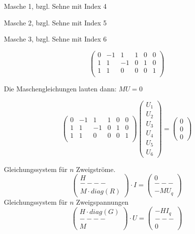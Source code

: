 \documentclass[german]{article}
\begin{document}
	Masche 1, bzgl. Sehne mit Index 4


	Masche 2, bzgl. Sehne mit Index 5


	Masche 3, bzgl. Sehne mit Index 6

	\[
		\begin{pmatrix}
			0 & -1 & 1 & 1 & 0 & 0 \\
			1 & 1 & -1 & 0 & 1 & 0 \\
			1 & 1 & 0 & 0 & 0 & 1 \\
		\end{pmatrix}
	\]

	Die Maschengleichungen lauten dann: $MU = 0$

	\[
		\begin{pmatrix}
			0 & -1 & 1 & 1 & 0 & 0 \\
			1 & 1 & -1 & 0 & 1 & 0 \\
			1 & 1 & 0 & 0 & 0 & 1 \\
		\end{pmatrix}
		\begin{pmatrix}
			U_1 \\
			U_2 \\
			U_3 \\
			U_4 \\
			U_5 \\
			U_6
		\end{pmatrix}
		=
		\begin{pmatrix}
			0 \\
			0 \\
			0
		\end{pmatrix}
	\]



	Gleichungssystem für $n$ Zweigströme.
	\[
		\begin{pmatrix}
			H \\
			---- \\
			M \cdot diag(R)
		\end{pmatrix}
		\cdot I =
		\begin{pmatrix}
			0 \\
			--- \\
			-M U_q
		\end{pmatrix}
	\]
	Gleichungssystem für $n$ Zweigspannungen
	\[
		\begin{pmatrix}
			H \cdot diag(G) \\
			---- \\
			M
		\end{pmatrix}
		\cdot U =
		\begin{pmatrix}
			-H I_q \\
			--- \\
			0
		\end{pmatrix}
	\]
\end{document}
